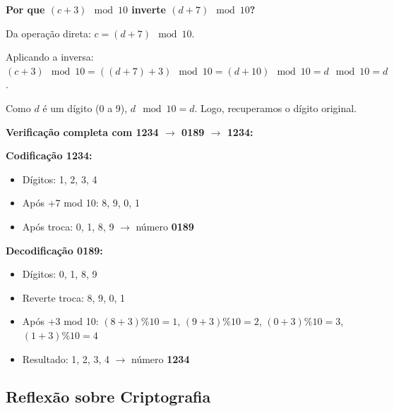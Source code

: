 \documentclass[12pt,a4paper]{article}
\begin{document}
\begin{respostabox}
\textbf{Por que $(c + 3) \mod 10$ inverte $(d + 7) \mod 10$?}

Da operação direta: $c = (d + 7) \mod 10$.

Aplicando a inversa: $(c + 3) \mod 10 = ((d + 7) + 3) \mod 10 = (d + 10) \mod 10 = d \mod 10 = d$.

Como $d$ é um dígito (0 a 9), $d \mod 10 = d$. Logo, recuperamos o dígito original.

\medskip\textbf{Verificação completa com 1234 \(\to\) 0189 \(\to\) 1234:}

\textbf{Codificação 1234:}
\begin{itemize}[noitemsep]
  \item Dígitos: 1, 2, 3, 4
  \item Após +7 mod 10: 8, 9, 0, 1
  \item Após troca: 0, 1, 8, 9 \(\to\) número \textbf{0189}
\end{itemize}

\textbf{Decodificação 0189:}
\begin{itemize}[noitemsep]
  \item Dígitos: 0, 1, 8, 9
  \item Reverte troca: 8, 9, 0, 1
  \item Após +3 mod 10: $(8+3)\%10=1$, $(9+3)\%10=2$, $(0+3)\%10=3$, $(1+3)\%10=4$
  \item Resultado: 1, 2, 3, 4 \(\to\) número \textbf{1234} \checkmark
\end{itemize}
\end{respostabox}

\subsection*{Reflexão sobre Criptografia}
\end{document}
